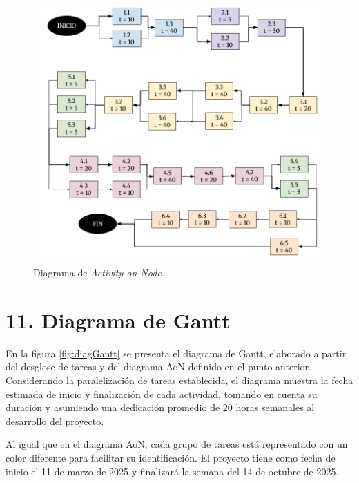 \documentclass[
11pt, %
]{charter}
\begin{document}
\begin{figure}[htpb]
\centering 
\includegraphics[width=.85\textwidth]{./Figuras/Diagrama-AoN.png}
\caption{Diagrama de \textit{Activity on Node}.}
\label{fig:AoN}
\end{figure}


\section{11. Diagrama de Gantt}
\label{sec:gantt}

En la figura \ref{fig:diagGantt} se presenta el diagrama de Gantt, elaborado a partir del desglose de tareas y del diagrama AoN definido en el punto anterior. Considerando la paralelización de tareas establecida, el diagrama muestra la fecha estimada de inicio y finalización de cada actividad, tomando en cuenta su duración y asumiendo una dedicación promedio de 20 horas semanales al desarrollo del proyecto.

Al igual que en el diagrama AoN, cada grupo de tareas está representado con un color diferente para facilitar su identificación. El proyecto tiene como fecha de inicio el 11 de marzo de 2025 y finalizará la semana del 14 de octubre de 2025.
\end{document}
